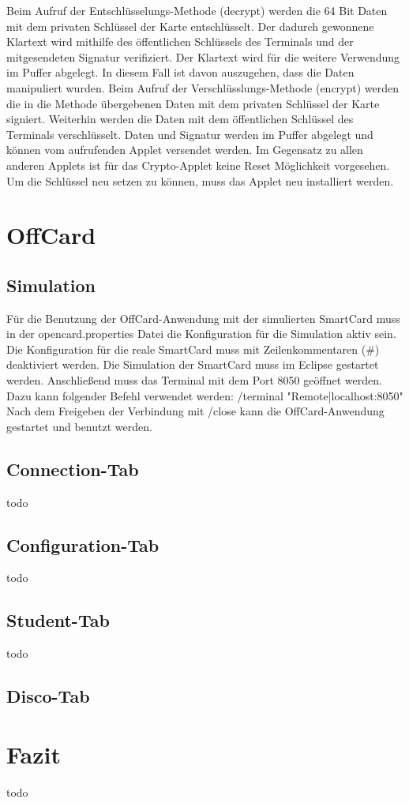 Beim Aufruf der Entschlüsselungs-Methode (decrypt) werden die 64 Bit Daten mit dem privaten Schlüssel der Karte entschlüsselt. 
Der dadurch gewonnene Klartext wird mithilfe des öffentlichen Schlüssels des Terminals und der mitgesendeten Signatur verifiziert. 
Der Klartext wird für die weitere Verwendung im Puffer abgelegt. 
In diesem Fall ist davon auszugehen, dass die Daten manipuliert wurden.
Beim Aufruf der Verschlüsslungs-Methode (encrypt) werden die in die Methode übergebenen Daten mit dem privaten Schlüssel der Karte signiert. 
Weiterhin werden die Daten mit dem öffentlichen Schlüssel des Terminals verschlüsselt. 
Daten und Signatur werden im Puffer abgelegt und können vom aufrufenden Applet versendet werden.
Im Gegensatz zu allen anderen Applets ist für das Crypto-Applet keine Reset Möglichkeit vorgesehen. Um die Schlüssel neu setzen zu können, muss das Applet neu installiert werden.

\section{OffCard}
\subsection{Simulation}
Für die Benutzung der OffCard-Anwendung mit der simulierten SmartCard muss in der opencard.properties Datei die Konfiguration für die Simulation aktiv sein.
Die Konfiguration für die reale SmartCard muss mit Zeilenkommentaren (\#) deaktiviert werden.
Die Simulation der SmartCard muss im Eclipse gestartet werden.
Anschließend muss das Terminal mit dem Port 8050 geöffnet werden. 
Dazu kann folgender Befehl verwendet werden:
/terminal "Remote|localhost:8050"
Nach dem Freigeben der Verbindung mit /close kann die OffCard-Anwendung gestartet und benutzt werden.

\subsection{Connection-Tab}
todo
\subsection{Configuration-Tab}
todo
\subsection{Student-Tab}
todo
\subsection{Disco-Tab}

\section{Fazit}
todo

